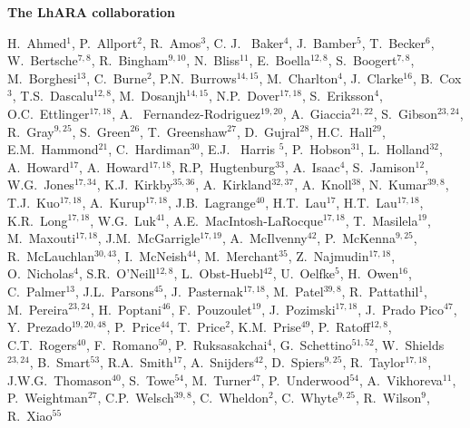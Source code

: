 \vspace{0.75cm}
\begin{center}
  {\bf \color{BlueViolet} The LhARA collaboration} \\
\end{center}
\vspace{0.50cm}
\begin{center}
  H.~Ahmed$^{1}$,
  P.~Allport$^{2}$,
  R.~Amos$^{3}$,
  C. J. ~Baker$^{4}$,
  J.~Bamber$^{5}$,
  T.~Becker$^{6}$,
  W.~Bertsche$^{7,8}$,
  R.~Bingham$^{9,10}$,
  N.~Bliss$^{11}$,
  E.~Boella$^{12,8}$,
  S.~Boogert$^{7,8}$,
  M.~Borghesi$^{13}$,
  C.~Burne$^{2}$,
  P.N.~Burrows$^{14,15}$,
  M.~Charlton$^{4}$,
  J.~Clarke$^{16}$,
  B.~Cox$^{3}$,
  T.S.~Dascalu$^{12,8}$,
  M.~Dosanjh$^{14,15}$,
  N.P.~Dover$^{17,18}$,
  S.~Eriksson$^{4}$,
  O.C.~Ettlinger$^{17,18}$,
  A. ~Fernandez-Rodriguez$^{19,20}$,
  A.~Giaccia$^{21,22}$,
  S.~Gibson$^{23,24}$,
  R.~Gray$^{9,25}$,
  S.~Green$^{26}$,
  T.~Greenshaw$^{27}$,
  D.~Gujral$^{28}$,
  H.C.~Hall$^{29}$,
  E.M.~Hammond$^{21}$,
  C.~Hardiman$^{30}$,
  E.J. ~Harris $^{5}$,
  P.~Hobson$^{31}$,
  L.~Holland$^{32}$,
  A.~Howard$^{17}$,
  A.~Howard$^{17,18}$,
  R.P,~Hugtenburg$^{33}$,
  A.~Isaac$^{4}$,
  S.~Jamison$^{12}$,
  W.G.~Jones$^{17,34}$,
  K.J.~Kirkby$^{35,36}$,
  A.~Kirkland$^{32,37}$,
  A.~Knoll$^{38}$,
  N.~Kumar$^{39,8}$,
  T.J.~Kuo$^{17,18}$,
  A.~Kurup$^{17,18}$,
  J.B.~Lagrange$^{40}$,
  H.T.~Lau$^{17}$,
  H.T.~Lau$^{17,18}$,
  K.R.~Long$^{17,18}$,
  W.G.~Luk$^{41}$,
  A.E.~MacIntosh-LaRocque$^{17,18}$,
  T.~Masilela$^{19}$,
  M.~Maxouti$^{17,18}$,
  J.M.~McGarrigle$^{17,19}$,
  A.~McIlvenny$^{42}$,
  P.~McKenna$^{9,25}$,
  R.~McLauchlan$^{30,43}$,
  I.~McNeish$^{44}$,
  M.~Merchant$^{35}$,
  Z.~Najmudin$^{17,18}$,
  O.~Nicholas$^{4}$,
  S.R.~O'Neill$^{12,8}$,
  L.~Obst-Huebl$^{42}$,
  U.~Oelfke$^{5}$,
  H.~Owen$^{16}$,
  C.~Palmer$^{13}$,
  J.L.~Parsons$^{45}$,
  J.~Pasternak$^{17,18}$,
  M.~Patel$^{39,8}$,
  R.~Pattathil$^{1}$,
  M.~Pereira$^{23,24}$,
  H.~Poptani$^{46}$,
  F.~Pouzoulet$^{19}$,
  J.~Pozimski$^{17,18}$,
  J.~Prado Pico$^{47}$,
  Y.~Prezado$^{19,20,48}$,
  P.~Price$^{44}$,
  T.~Price$^{2}$,
  K.M.~Prise$^{49}$,
  P.~Ratoff$^{12,8}$,
  C.T.~Rogers$^{40}$,
  F.~Romano$^{50}$,
  P.~Ruksasakchai$^{4}$,
  G.~Schettino$^{51,52}$,
  W.~Shields$^{23,24}$,
  B.~Smart$^{53}$,
  R.A.~Smith$^{17}$,
  A.~Snijders$^{42}$,
  D.~Spiers$^{9,25}$,
  R.~Taylor$^{17,18}$,
  J.W.G.~Thomason$^{40}$,
  S.~Towe$^{54}$,
  M.~Turner$^{47}$,
  P.~Underwood$^{54}$,
  A.~Vikhoreva$^{11}$,
  P.~Weightman$^{27}$,
  C.P.~Welsch$^{39,8}$,
  C.~Wheldon$^{2}$,
  C.~Whyte$^{9,25}$,
  R.~Wilson$^{9}$,
  R.~Xiao$^{55}$
\end{center}
